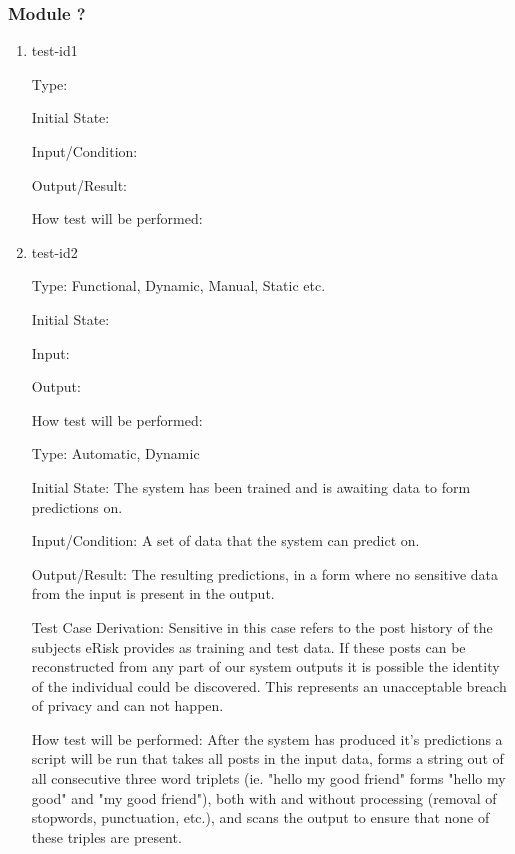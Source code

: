 \documentclass[12pt, titlepage]{article}
\begin{document}


\subsubsection{Module ?}
		
\begin{enumerate}

\item{test-id1\\}

Type: 
					
Initial State: 
					
Input/Condition: 
					
Output/Result: 
					
How test will be performed: 
					
\item{test-id2\\}

Type: Functional, Dynamic, Manual, Static etc.
					
Initial State: 
					
Input: 
					
Output: 
					
How test will be performed: 

Type: Automatic, Dynamic
					
Initial State: The system has been trained and is awaiting data to form predictions on.
					
Input/Condition: A set of data that the system can predict on.
					
Output/Result: The resulting predictions, in a form where no sensitive data from the input is present in the output.

Test Case Derivation: Sensitive in this case refers to the post history of the subjects eRisk provides as training and test data. If these posts can be reconstructed from any part of our system outputs it is possible the identity of the individual could be discovered. This represents an unacceptable breach of privacy and can not happen.
					
How test will be performed: After the system has produced it's predictions a script will be run that takes all posts in the input data, forms a string out of all consecutive three word triplets (ie. "hello my good friend" forms "hello my good" and "my good friend"), both with and without processing (removal of stopwords, punctuation, etc.), and scans the output to ensure that none of these triples are present.

\end{enumerate}
\end{document}
